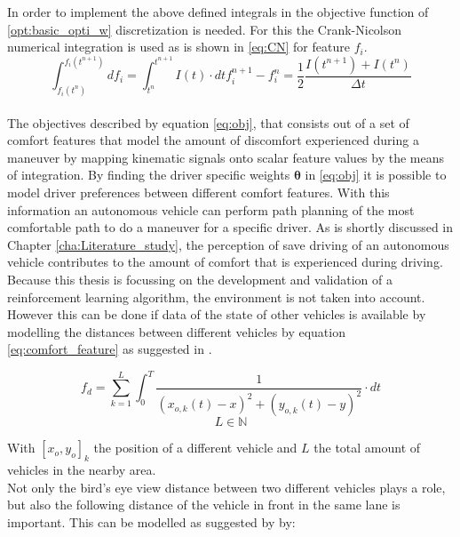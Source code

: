 In order to implement the above defined integrals in the objective function of \ref{opt:basic_opti_w} discretization is needed. For this the Crank-Nicolson numerical integration is used as is shown in \ref{eq:CN} for feature $f_i$. 
\begin{subequations}\label{eq:CN}
	\begin{equation}
	\int_{f_i(t^n)}^{f_i(t^{n+1})}df_i=\int_{t^n}^{t^{n+1}} I(t) \cdot dt	
	\end{equation}
	\begin{equation}
	f_i^{n+1} -f_i^{n} = \frac{1}{2}\frac{I(t^{n+1})+I(t^n)}{\Delta t}
	\end{equation}
\end{subequations}\\

The objectives described by equation \ref{eq:obj}, that consists out of a set of comfort features that model the amount of discomfort experienced during a maneuver by mapping kinematic signals onto scalar feature values by the means of integration. By finding the driver specific weights $\bm{\theta}$ in \ref{eq:obj} it is possible to model driver preferences between different comfort features. With this information an autonomous vehicle can perform path planning of the most comfortable path to do a maneuver for a specific driver. As is shortly discussed in Chapter \ref{cha:Literature_study}, the perception of save driving of an autonomous vehicle contributes to the amount of comfort that is experienced during driving. Because this thesis is focussing on the development and validation of a reinforcement learning algorithm, the environment is not taken into account. However this can be done if data of the state of other vehicles is available by modelling the distances between different vehicles by equation \ref{eq:comfort_feature} as suggested in \cite{Kuderer2015a}. 

\begin{equation}\label{eq:comfort_feature}
f_d= \sum_{k = 1}^{L}\int_{0}^{T}\frac{1}{(x_{o,k}(t)-x)^2+(y_{o,k}(t)-y)^2}\cdot dt
\end{equation}
\[L \in \mathbb{N}\]

With $[x_o,y_o]_k$ the position of a different vehicle and $L$ the total amount of vehicles in the nearby area.\\

Not only the bird's eye view distance between two different vehicles plays a role, but also the following distance of the vehicle in front in the same lane is important. This can be modelled as suggested by \cite{Kuderer2015a} by:  

